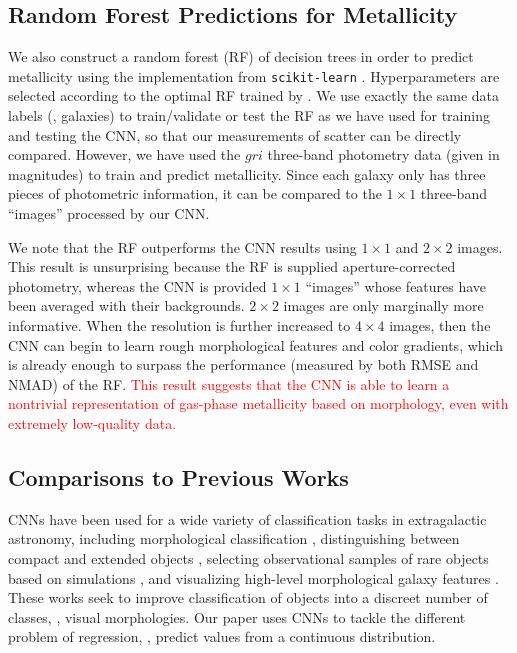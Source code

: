 \documentclass[fleqn,usenatbib]{mnras}
\newcommand{\editorial}[1]{\textcolor{red}{#1}}
\begin{document}
\subsection{Random Forest Predictions for Metallicity}
We also construct a random forest (RF) of decision trees in order to predict metallicity using the implementation from \texttt{scikit-learn} \citep{Pedregosa2012}. Hyperparameters are selected according to the optimal RF trained by \cite{Acquaviva2016}. We use exactly the same data labels (\ie, galaxies) to train/validate or test the RF as we have used for training and testing the CNN, so that our measurements of scatter can be directly compared. However, we have used the $gri$ three-band photometry data (given in magnitudes) to train and predict metallicity. Since each galaxy only has three pieces of photometric information, it can be compared to the $1 \times 1$ three-band ``images'' processed by our CNN.

We note that the RF outperforms the CNN results using $1\times 1$ and $2 \times 2$ images.
This result is unsurprising because the RF is supplied aperture-corrected photometry, whereas the CNN is provided $1 \times 1 $ \sdssi\sdssr\sdssg ``images'' whose features have been averaged with their backgrounds. $2 \times 2$ images are only marginally more informative. When the resolution is further increased to $4 \times 4$ images, then the CNN can begin to learn rough morphological features and color gradients, which is already enough to surpass the performance (measured by both RMSE and NMAD) of the RF.
\editorial{This result suggests that the CNN is able to learn a nontrivial representation of gas-phase metallicity based on morphology, even with extremely low-quality data.}

\subsection{Comparisons to Previous Works}\label{sec:previous work}
CNNs have been used for a wide variety of classification tasks in extragalactic astronomy, including morphological classification , distinguishing between compact and extended objects \citep{Kim2017}, selecting observational samples of rare objects based on simulations \citep{Huertas-Company2018, Lanusse2017}, and visualizing high-level morphological galaxy features \citep{Dai2018}. These works seek to improve classification of objects into a discreet number of classes, \ie, visual morphologies. Our paper uses CNNs to tackle the different problem of regression, \ie, predict values from a continuous distribution.
\end{document}
